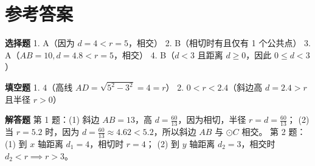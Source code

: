 \documentclass{exam-zh}
\begin{document}
\clearpage
\section*{参考答案}


\begin{keyideabox}
  \textbf{选择题}
  1. A（因为 $d = 4 < r = 5$，相交）
2. B（相切时有且仅有 1 个公共点）
3. A（$AB=10, d=4.8 < r=5$，相交）
4. B（$d < 3$ 且距离 $d \ge 0$，因此 $0 \le d < 3$）

\end{keyideabox}



\begin{keyideabox}
  \textbf{填空题}
  1. $4$（高线 $AD = \sqrt{5^2 - 3^2} = 4 = r$）
2. $0 < r < 2.4$（斜边高 $d = 2.4 > r$ 且半径 $r > 0$）

\end{keyideabox}



\begin{keyideabox}
  \textbf{解答题}
  第 1 题：(1) 斜边 $AB = 13$，高 $d = \frac{60}{13}$，因为相切，半径 $r = d = \frac{60}{13}$；
(2) 当 $r = 5.2$ 时，因为 $d = \frac{60}{13} \approx 4.62 < 5.2$，所以斜边 $AB$ 与 $\odot C$ 相交。
第 2 题：(1) 到 $x$ 轴距离 $d_1 = 4$，相切时 $r = 4$；
(2) 到 $y$ 轴距离 $d_2 = 3$，相交时 $d_2 < r \implies r > 3$。

\end{keyideabox}
\end{document}
